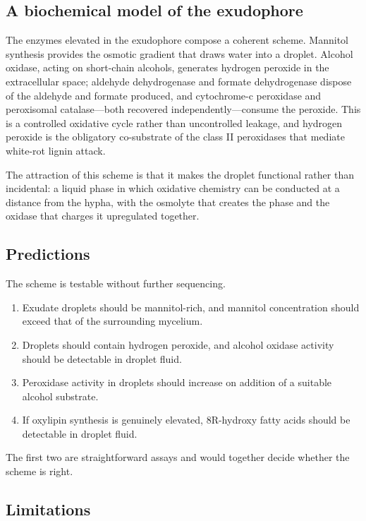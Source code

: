 \subsection{A biochemical model of the exudophore}

The enzymes elevated in the exudophore compose a coherent scheme. Mannitol synthesis provides
the osmotic gradient that draws water into a droplet. Alcohol oxidase, acting on short-chain
alcohols, generates hydrogen peroxide in the extracellular space; aldehyde dehydrogenase and
formate dehydrogenase dispose of the aldehyde and formate produced, and cytochrome-c peroxidase
and peroxisomal catalase---both recovered independently---consume the peroxide. This is a
controlled oxidative cycle rather than uncontrolled leakage, and hydrogen peroxide is the
obligatory co-substrate of the class II peroxidases that mediate white-rot lignin attack.

The attraction of this scheme is that it makes the droplet functional rather than incidental: a
liquid phase in which oxidative chemistry can be conducted at a distance from the hypha, with
the osmolyte that creates the phase and the oxidase that charges it upregulated together.

\subsection{Predictions}

The scheme is testable without further sequencing.
\begin{enumerate}
\item Exudate droplets should be mannitol-rich, and mannitol concentration should exceed that
of the surrounding mycelium.
\item Droplets should contain hydrogen peroxide, and alcohol oxidase activity should be
detectable in droplet fluid.
\item Peroxidase activity in droplets should increase on addition of a suitable alcohol
substrate.
\item If oxylipin synthesis is genuinely elevated, 8R-hydroxy fatty acids should be detectable
in droplet fluid.
\end{enumerate}
The first two are straightforward assays and would together decide whether the scheme is right.

\subsection{Limitations}

